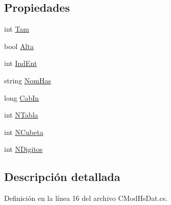 \subsection*{Propiedades}
\begin{DoxyCompactItemize}
\item 
int \hyperlink{class_diccionario_1_1_c_mod_hs_dat_a4eb63c706c67d2590c17597011db7a01}{Tam}
\item 
bool \hyperlink{class_diccionario_1_1_c_mod_hs_dat_a7c62db8fa1bbc79ee81b4ec8e23beb6e}{Alta}
\item 
int \hyperlink{class_diccionario_1_1_c_mod_hs_dat_a38f0a77d02a4dacfd0519122d244e318}{Ind\-Ent}
\item 
string \hyperlink{class_diccionario_1_1_c_mod_hs_dat_a084ee869c9c1502b677edfc6555a49dc}{Nom\-Has}
\item 
long \hyperlink{class_diccionario_1_1_c_mod_hs_dat_a8e18bc5eb317b212efdb11d3bb874986}{Cab\-In}
\item 
int \hyperlink{class_diccionario_1_1_c_mod_hs_dat_afbfce8091f2007aaf72782b885e9f99c}{N\-Tabla}
\item 
int \hyperlink{class_diccionario_1_1_c_mod_hs_dat_a5b97a38442b0632e09337756e0ae2ec5}{N\-Cubeta}
\item 
int \hyperlink{class_diccionario_1_1_c_mod_hs_dat_a89df7d00fada8786f2e3546103a0da29}{N\-Digitos}
\end{DoxyCompactItemize}


\subsection{Descripción detallada}


Definición en la línea 16 del archivo C\-Mod\-Hs\-Dat.\-cs.



